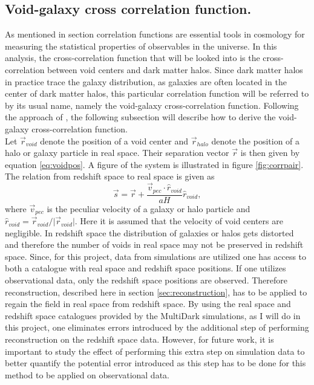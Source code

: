 \subsection{Void-galaxy cross correlation function.}\label{sec:vgcrosscorr}
As mentioned in section  correlation functions are
essential tools in cosmology for measuring the statistical properties of
observables in the universe. In this analysis, the cross-correlation function that
will be looked into is the cross-correlation between void centers and dark matter halos. Since dark matter halos in practice trace the galaxy distribution, as galaxies are often located in the center of dark matter halos, this particular correlation function will be referred to by its usual name, namely the void-galaxy cross-correlation function. Following the approach of \cite{Nadathur_corr}, the following
subsection will describe how to derive the void-galaxy cross-correlation
function. 
\\\indent
Let $\vec{r}_{void}$ denote the position of a void center and $\vec{r}_{halo}$ denote the
position of a halo or galaxy particle in real space. Their separation vector $\vec{r}$ is then
given by equation \ref{eq:voidpos}. A figure of the system is illustrated in figure \ref{fig:corrpair}. The relation from redshift space to real space
is given as
\begin{equation}\label{eq:s_to_r}
    \vec{s}=\vec{r}+\frac{\vec{v}_{pec}\cdot\hat{r}_{void}}{aH}\hat{r}_{void},
\end{equation}
where $\vec{v}_{pec}$ is the peculiar velocity of a galaxy or halo particle and
$\hat{r}_{void}=\vec{r}_{void}/ \vert \vec{r}_{void}\vert$. Here it is assumed
that the velocity of void centers are negligible. In redshift space the distribution of galaxies or halos gets distorted and therefore the number of voids in
real space may not be preserved in redshift space. Since, for this project, data from simulations are utilized one has access to both a catalogue with real space and redshift space positions. If one utilizes observational data, only the redshift space positions are observed. Therefore reconstruction,
described here in section \ref{sec:reconstruction}, has to be applied to regain
the field in real space from redshift space. By using the real space and redshift space catalogues provided by the MultiDark simulations\cite{Multidark_dataset}, as I will do in this project, one eliminates errors introduced by the additional step of performing reconstruction on the redshift space data. However, for future work, it is important to study the effect of performing this extra step on simulation data to better quantify the potential error introduced as this step has to be done for this method to be applied on observational data.\\\indent
